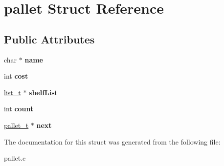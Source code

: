 \hypertarget{structpallet}{}\section{pallet Struct Reference}
\label{structpallet}
\subsection*{Public Attributes}
\begin{DoxyCompactItemize}
\item 
\hypertarget{structpallet_ab654b21bf96e11e16116185a5a15f227}{}char $\ast$ {\bfseries name}\label{structpallet_ab654b21bf96e11e16116185a5a15f227}

\item 
\hypertarget{structpallet_a765abc3c0ba59fbece7fa08f08a7695a}{}int {\bfseries cost}\label{structpallet_a765abc3c0ba59fbece7fa08f08a7695a}

\item 
\hypertarget{structpallet_af641af079ea20aa6fe443f2db9257be1}{}\hyperlink{structlist}{list\+\_\+t} $\ast$ {\bfseries shelf\+List}\label{structpallet_af641af079ea20aa6fe443f2db9257be1}

\item 
\hypertarget{structpallet_afb6d2860bff3187efaf7e897026542e8}{}int {\bfseries count}\label{structpallet_afb6d2860bff3187efaf7e897026542e8}

\item 
\hypertarget{structpallet_ad4a81651be871dabb8786c66ad83bad0}{}\hyperlink{structpallet}{pallet\+\_\+t} $\ast$ {\bfseries next}\label{structpallet_ad4a81651be871dabb8786c66ad83bad0}

\end{DoxyCompactItemize}


The documentation for this struct was generated from the following file\+:\begin{DoxyCompactItemize}
\item 
pallet.\+c\end{DoxyCompactItemize}
